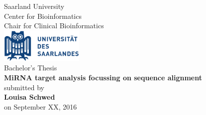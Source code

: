 \documentclass[12pt]{article}
\begin{document}
\def\supervisorIname{Advisor I}
\def\supervisorIIname{Second Reviewer}

	\def\university{Universit\"{a}t des Saarlandes}
	\def\institute{Center for Bioinformatics}
	\def\chair{Chair for Clinical Bioinformatics??}
	\def\projectname{MiRNA target analysis focussing on sequence alignment}
	\vspace{.2em}  
	\def\author{Louisa Schwed}
	\def\date{September 2016}

\begin{titlepage}

  \begin{minipage}{\textwidth}
    \begin{center}
    { \large Saarland University \\ Center for Bioinformatics \\ Chair for Clinical Bioinformatics \\}
	\vspace{0.5cm}
    \includegraphics[width=4cm]{Logo-Universitaet_des_Saarlandes.pdf}\\
    \vspace{0.5cm}
    { \large Bachelor's Thesis\\}
    \vspace{0.5cm}
    {\huge\textbf{\projectname}}\\
    \vspace{0.5cm}
    { \large submitted by}\\
	\vspace{0.5cm}
    {\large\textbf{\author}}\\
    \vspace{0.5cm}
    {\large on September XX, 2016}\\
    \vspace{0.5cm}
    \end{center}
  \end{minipage}



\end{titlepage}
\end{document}
